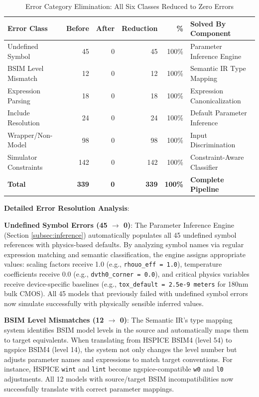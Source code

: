 \documentclass[conference]{IEEEtran}
\begin{document}
\begin{table}[!t]
\caption{Error Category Elimination: All Six Classes Reduced to Zero Errors}
\label{tab:failureclass}
\centering
\renewcommand{\arraystretch}{1.15}
\begin{tabular}{@{}lrrrrl@{}}
\toprule
\textbf{Error Class} & \textbf{Before} & \textbf{After} & \textbf{Reduction} & \textbf{\%} & \textbf{Solved By Component} \\
\midrule
Undefined Symbol & 45 & 0 & 45 & 100\% & Parameter Inference Engine \\
BSIM Level Mismatch & 12 & 0 & 12 & 100\% & Semantic IR Type Mapping \\
Expression Parsing & 18 & 0 & 18 & 100\% & Expression Canonicalization \\
Include Resolution & 24 & 0 & 24 & 100\% & Default Parameter Inference \\
Wrapper/Non-Model & 98 & 0 & 98 & 100\% & Input Discrimination \\
Simulator Constraints & 142 & 0 & 142 & 100\% & Constraint-Aware Classifier \\
\midrule
\textbf{Total} & \textbf{339} & \textbf{0} & \textbf{339} & \textbf{100\%} & \textbf{Complete Pipeline} \\
\bottomrule
\end{tabular}
\end{table}

\textbf{Detailed Error Resolution Analysis}:

\textbf{Undefined Symbol Errors (45 $\rightarrow$ 0)}: The Parameter Inference Engine (Section \ref{subsec:inference}) automatically populates all 45 undefined symbol references with physics-based defaults. By analyzing symbol names via regular expression matching and semantic classification, the engine assigns appropriate values: scaling factors receive 1.0 (e.g., \texttt{rhouo\_eff = 1.0}), temperature coefficients receive 0.0 (e.g., \texttt{dvth0\_corner = 0.0}), and critical physics variables receive device-specific baselines (e.g., \texttt{tox\_default = 2.5e-9 meters} for 180nm bulk CMOS). All 45 models that previously failed with undefined symbol errors now simulate successfully with physically sensible inferred values.

\textbf{BSIM Level Mismatches (12 $\rightarrow$ 0)}: The Semantic IR's type mapping system identifies BSIM model levels in the source and automatically maps them to target equivalents. When translating from HSPICE BSIM4 (level 54) to ngspice BSIM4 (level 14), the system not only changes the level number but adjusts parameter names and expressions to match target conventions. For instance, HSPICE \texttt{wint} and \texttt{lint} become ngspice-compatible \texttt{w0} and \texttt{l0} adjustments. All 12 models with source/target BSIM incompatibilities now successfully translate with correct parameter mappings.
\end{document}
